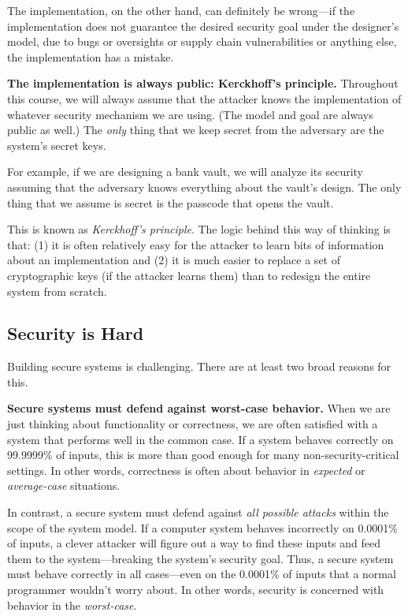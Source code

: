 \documentclass[
  letterpaper,
]{scrbook}
\theoremstyle{definition}
\theoremstyle{plain}
\theoremstyle{plain}
\theoremstyle{remark}
\begin{document}
The implementation, on the other hand, can definitely be wrong---if the
implementation does not guarantee the desired security goal under the
designer's model, due to bugs or oversights or supply chain
vulnerabilities or anything else, the implementation has a mistake.

\textbf{The implementation is always public: Kerckhoff's principle.}
Throughout this course, we will always assume that the attacker knows
the implementation of whatever security mechanism we are using. (The
model and goal are always public as well.) The \emph{only} thing that we
keep secret from the adversary are the system's secret keys.

For example, if we are designing a bank vault, we will analyze its
security assuming that the adversary knows everything about the vault's
design. The only thing that we assume is secret is the passcode that
opens the vault.

This is known as \emph{Kerckhoff's principle}. The logic behind this way
of thinking is that: (1) it is often relatively easy for the attacker to
learn bits of information about an implementation and (2) it is much
easier to replace a set of cryptographic keys (if the attacker learns
them) than to redesign the entire system from scratch.

\subsection{Security is Hard}\label{security-is-hard}

Building secure systems is challenging. There are at least two broad
reasons for this.

\textbf{Secure systems must defend against worst-case behavior.} When we
are just thinking about functionality or correctness, we are often
satisfied with a system that performs well in the common case. If a
system behaves correctly on 99.9999\% of inputs, this is more than good
enough for many non-security-critical settings. In other words,
correctness is often about behavior in \emph{expected} or
\emph{average-case} situations.

In contrast, a secure system must defend against \emph{all possible
attacks} within the scope of the system model. If a computer system
behaves incorrectly on 0.0001\% of inputs, a clever attacker will figure
out a way to find these inputs and feed them to the system---breaking
the system's security goal. Thus, a secure system must behave correctly
in all cases---even on the 0.0001\% of inputs that a normal programmer
wouldn't worry about. In other words, security is concerned with
behavior in the \emph{worst-case}.
\end{document}
